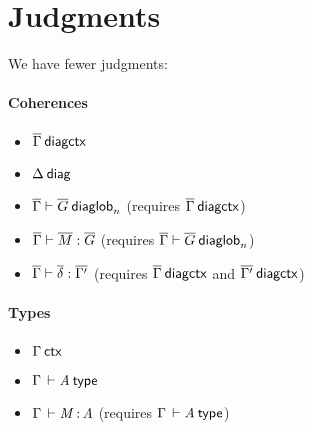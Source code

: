 \section{Judgments}

We have fewer judgments:

\paragraph{Coherences}

\begin{small}
\begin{itemize}
\item ${\overline{\Gamma}} \: \mathsf{diagctx}$
\item $\Delta \: \mathsf{diag}$
\item ${\overline{\Gamma}} \vdash {\ensuremath{\overline{G}}} \: \mathsf{diaglob}_{n}$ (requires ${\overline{\Gamma}} \: \mathsf{diagctx}$)
\item ${\overline{\Gamma}} \vdash {\ensuremath{\overline{M}}} : {\overline{G}}$
(requires ${\overline{\Gamma}} \vdash {\ensuremath{\overline{G}}} \: \mathsf{diaglob}_{n}$)
\item ${\overline{\Gamma}} \vdash {\ensuremath{\overline{\delta}}} : {\overline{\Gamma'}}$
(requires ${\overline{\Gamma}} \: \mathsf{diagctx}$ and ${\overline{\Gamma'}} \: \mathsf{diagctx}$)
\end{itemize}
\end{small}


\paragraph{Types}

\begin{small}
\begin{itemize}
\item ${\Gamma} \: \mathsf{ctx}$
\item $\Gamma\,\vdash \mathit{A}\:\mathsf{type}$
\item $\Gamma \, \vdash \mathit{M} \, \mathit{:} \, \mathit{A}$ (requires $\Gamma\,\vdash \mathit{A}\:\mathsf{type}$)
\end{itemize}
\end{small}

